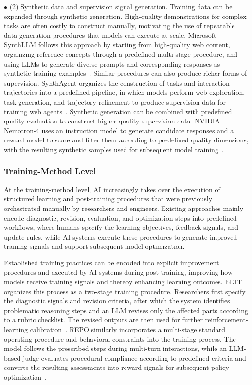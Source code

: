 \noindent$\bullet$ \underline{(2) {Synthetic data and supervision signal generation.}} Training data can be expanded through synthetic generation. High-quality demonstrations for complex tasks are often costly to construct manually, motivating the use of repeatable data-generation procedures that models can execute at scale. Microsoft SynthLLM follows this approach by starting from high-quality web content, organizing reference concepts through a predefined multi-stage procedure, and using LLMs to generate diverse prompts and corresponding responses as synthetic training examples~\cite{synthllm}. Similar procedures can also produce richer forms of supervision. SynthAgent organizes the construction of tasks and interaction trajectories into a predefined pipeline, in which models perform web exploration, task generation, and trajectory refinement to produce supervision data for training web agents~\cite{wang-etal-2026-synthagent}. Synthetic generation can be combined with predefined quality evaluation to construct higher-quality supervision data. NVIDIA Nemotron-4 uses an instruction model to generate candidate responses and a reward model to score and filter them according to predefined quality dimensions, with the resulting synthetic samples used for subsequent model training~\cite{nemotron4_340b}.

\subsubsection{Training-Method Level}
At the training-method level, AI increasingly takes over the execution of structured learning and post-training procedures that were previously orchestrated manually by researchers and engineers. Existing approaches mainly encode diagnostic, revision, evaluation, and optimization steps into predefined workflows, where humans specify the learning objectives, feedback signals, and update rules, while AI systems execute these procedures to generate improved training signals and support subsequent model optimization.

Established training practices can be encoded into explicit improvement procedures and executed by AI systems during post-training, improving how models receive training signals and thereby enhancing learning outcomes. EDIT organizes this process as a two-stage training procedure. Researchers first specify the diagnostic signals and revision criteria, after which the system identifies problematic reasoning steps and an LLM revises only the affected parts according to a rubric checklist. The revised outputs are then used for further reinforcement-learning calibration~\cite{wu2026edit}. REPO similarly incorporates a multi-stage standard operating procedure and behavioral constraints into the training process. The model follows the prescribed steps during multi-turn interactions, while an LLM-based judge evaluates procedural compliance according to predefined criteria and converts the resulting assessments into reward signals for subsequent policy optimization~\cite{zeng-etal-2026-teaching}.

